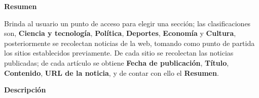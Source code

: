 
\begin{large}
	\textbf{Resumen}\\
\end{large}

Brinda al usuario un punto de acceso para elegir una sección; las clasificaciones son, \textbf{Ciencia y tecnología}, \textbf{Política}, \textbf{Deportes}, \textbf{Economía} y  \textbf{Cultura}, posteriormente se recolectan noticias de la web, tomando como punto de partida los sitios establecidos previamente. De cada sitio se recolectan las noticias publicadas; de cada artículo se obtiene \textbf{Fecha de publicación}, \textbf{Título}, \textbf{Contenido}, \textbf{URL de la noticia}, y de contar con ello el \textbf{Resumen}.\\

\begin{large}
	\textbf{Descripción}\\
\end{large} 




